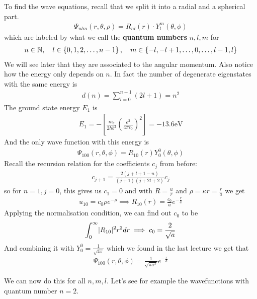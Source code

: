 To find the wave equations, recall that we split it into a radial and a spherical part.
\begin{align*}
	\Psi_{nlm}(r,\theta,\rho) = R_{nl}(r) \cdot Y_l^{m}(\theta,\phi)
\end{align*}
which are labeled by what we call the \textbf{quantum numbers} $n,l,m$ for
\begin{align*}
	n \in \mathbb{N}, \quad l \in \left\{0,1,2, \ldots, n-1\right\}, \quad m \in \left\{-l, -l+1, \ldots, 0, \ldots, l-1, l\right\}
\end{align*}
We will see later that they are associated to the angular momentum. 
Also notice how the energy only depends on $n$. In fact the number of degenerate eigenstates with the same energy is
\begin{align*}
	d(n) = \sum_{l=0}^{n-1}(2l+1) = n^{2}
\end{align*}
The ground state energy $E_1$ is
\begin{align*}
	E_1 = - \left[\frac{m_e}{2hb^{2}} \left(
		\frac{e^{2}}{4\pi \epsilon_0}
	\right)^{2}\right] = - 13.6 \text{eV} 
\end{align*}
And the only wave function with this energy is
\begin{align*}
	\Psi_{100}(r,\theta,\phi) = R_{10}(r)Y_0^{0}(\theta,\phi)
\end{align*}
Recall the recursion relation for the coefficients $c_j$ from before:
\begin{align*}
	c_{j+1} = \frac{2(j+l+1-n)}{(j+1)(j+2l+2)}c_j
\end{align*}
so for $n = 1, j = 0$, this gives us $c_1 = 0$ and with $R = \frac{u}{r}$ and $\rho = \kappa r = \frac{r}{a}$ we get
\begin{align*}
	u_{10} = c_0 \rho e^{-\rho} \implies R_{10}(r) = \frac{c_0}{a}e^{-\frac{r}{a}}
\end{align*}
Applying the normalisation condition, we can find out $c_0$ to be
\begin{align*}
	\int_{0}^{\infty}\abs{R_{10}}^{2}r^2 dr \implies c_0 = \frac{2}{\sqrt{a}}
\end{align*}
And combining it with $Y_0^{0} = \frac{1}{\sqrt{4 \pi}}$ which we found in the last lecture we get that
\begin{align*}
	\Psi_{100}(r,\theta,\phi) = \frac{1}{\sqrt{\pi a^{3}}} e^{-\frac{r}{a}}
\end{align*}

We can now do this for all $n,m,l$. Let's see for example the wavefunctions with quantum number $n = 2$.


